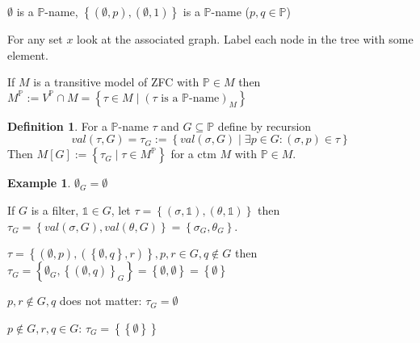 \documentclass{scrartcl}
\newcommand{\set}[1]{\left\{#1\right\}}
\theoremstyle{definition}
\newtheorem*{definition*}{Definition}
\newtheorem*{example*}{Example}
\theoremstyle{plain}
\theoremstyle{remark}
\begin{document}
 	$\emptyset$ is a $\mathbb{P}$-name, $\set{(\emptyset, p), (\emptyset, 1)}$ is a $\mathbb{P}$-name ($p, q \in \mathbb{P}$)
 	
 	For any set $x$ look at the associated graph. Label each node in the tree with some element.
 	
 	If $M$ is a transitive model of ZFC with $\mathbb{P} \in M$ then $M^\mathbb{P} := V^\mathbb{P} \cap M = \set{\tau \in M \mid (\tau \text{ is a } \mathbb{P}\text{-name})_M }$
 	
 	\begin{definition*}
 		For a $\mathbb{P}$-name $\tau$ and $G \subseteq \mathbb{P}$ define by recursion 
 		\[val(\tau, G) = \tau_G := \set{val(\sigma, G) \mid \exists p \in G: (\sigma, p) \in \tau}\]
 		Then $M[G] := \set{\tau_G \mid \tau \in M^\mathbb{P}}$ for a ctm $M$ with $\mathbb{P} \in M$.
 	\end{definition*}
 
 	\begin{example*}
 		$\emptyset_G = \emptyset$
 		
 		If $G$ is a filter, $\mathbb{1} \in G$, let $\tau = \set{(\sigma, \mathbb{1}), (\theta, \mathbb{1})}$ then
 		$\tau_G = \set{val(\sigma, G), val(\theta, G)} = \set{\sigma_G, \theta_G}$.
 		
 		$\tau = \set{(\emptyset, p), (\set{\emptyset, q}, r)}, p,r \in G, q \notin G $ then $\tau_G = \set{\emptyset_G, \set{(\emptyset,q)}_G} = \set{\emptyset, \emptyset} = \set{\emptyset}$
 		
 		$p, r \notin G, q$ does not matter: $\tau_G = \emptyset$
 		
 		$p\notin G, r,q\in G$: $\tau_G= \set{\set{\emptyset}}$
 	\end{example*}
 
\end{document}
